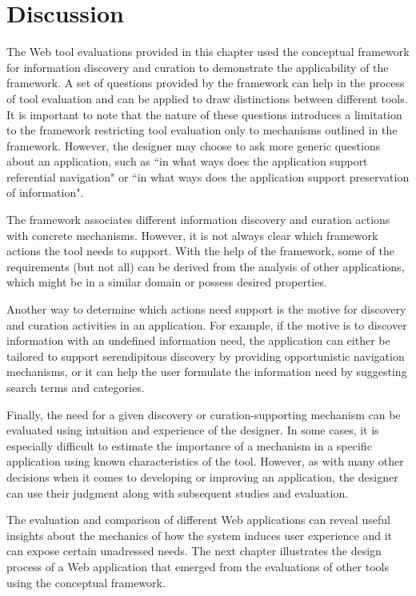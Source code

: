 {\section{Discussion}
The Web tool evaluations provided in this chapter used the conceptual framework for information discovery and curation to demonstrate the applicability of the framework. A set of questions provided by the framework can help in the process of tool evaluation and can be applied to draw distinctions between different tools. It is important to note that the nature of these questions introduces a limitation to the framework restricting tool evaluation only to mechanisms outlined in the framework. However, the designer may choose to ask more generic questions about an
application, such as ``in what ways does the application support referential navigation" or ``in
what ways does the application support preservation of information".

The framework associates different information discovery and curation actions with concrete mechanisms. However, it is not always clear which framework actions the tool needs to support. With the help of the framework, some of the requirements (but not all) can be derived from the analysis of other applications, which might be in a similar domain or possess desired properties. 

Another way to determine which actions need support is the motive for discovery and curation activities in an application. For example, if the motive is to discover information with an undefined information need, the application  can either be tailored to support serendipitous discovery by providing opportunistic navigation mechanisms, or it can help the user formulate the information need by suggesting search terms and categories.

Finally, the need for a given discovery or curation-supporting mechanism can be evaluated using intuition and experience of the designer. In some cases, it is especially difficult to estimate the importance of a mechanism in a specific application using known characteristics of the tool. However, as with many other decisions when it comes to developing or improving an application, the designer can use their judgment along with subsequent studies and evaluation. 

The evaluation and comparison of different Web applications can reveal useful insights about the mechanics of how the system induces user experience and it can expose certain unadressed needs. The next chapter illustrates the design process of a Web application that emerged from the evaluations of other tools using the conceptual framework. 

} %
